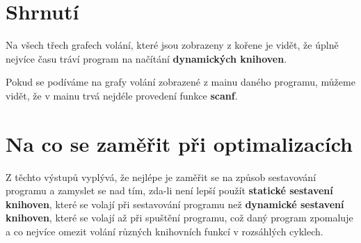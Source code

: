 \documentclass[11pt,a4paper,titlepage]{article}
\begin{document}
	\begin{figure}[ht]
		\centering
	\end{figure}
	\begin{figure}[ht]
		\centering
	\end{figure}

	\newpage

	\section{Shrnutí}

	Na všech třech grafech volání, které jsou zobrazeny z kořene je vidět, že úplně nejvíce času tráví program na načítání \textbf {dynamických knihoven}.

	\noindent Pokud se podíváme na grafy volání zobrazené z mainu daného programu, můžeme vidět, že v mainu trvá nejdéle provedení funkce \textbf{scanf}.

	\section{Na co se zaměřit při optimalizacích}

	Z těchto výstupů vyplývá, že nejlépe je zaměřit se na způsob sestavování programu a zamyslet se nad tím, zda-li není lepší použít \textbf{statické sestavení knihoven}, které se volají při sestavování programu než \textbf{dynamické sestavení knihoven}, které se volají až při spuštění programu, což daný program zpomaluje a co nejvíce omezit volání různých knihovních funkcí v rozsáhlých cyklech.
\end{document}
